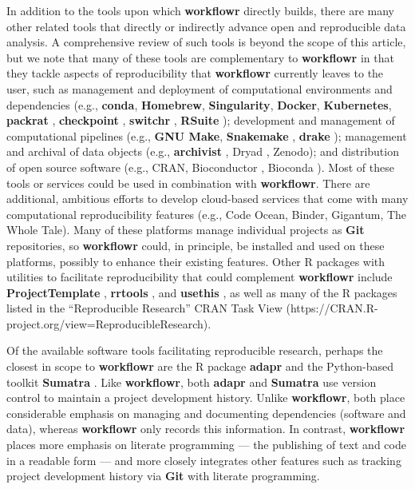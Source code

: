 \documentclass[9pt,a4paper]{extarticle}
\begin{document}
In addition to the tools upon which \textbf{workflowr} directly builds, there are
many other related tools that directly or indirectly advance open and
reproducible data analysis. A comprehensive review of such tools is
beyond the scope of this article, but we note that many of these tools
are complementary to \textbf{workflowr} in that they tackle aspects of
reproducibility that \textbf{workflowr} currently leaves to the user, such as
management and deployment of computational environments and dependencies
(e.g., \textbf{conda}, \textbf{Homebrew}, \textbf{Singularity}, \textbf{Docker}, \textbf{Kubernetes}, \textbf{packrat}
\cite{packrat}, \textbf{checkpoint} \cite{checkpoint}, \textbf{switchr} \cite{switchr},
 \textbf{RSuite} \cite{rsuite}); development and management of computational
pipelines (e.g., \textbf{GNU Make}, \textbf{Snakemake} \cite{snakemake}, \textbf{drake}
\cite{drake}); management and archival of data objects (e.g., \textbf{archivist}
\cite{archivist}, Dryad \cite{dryad}, Zenodo); and distribution of open
source software (e.g., CRAN, Bioconductor \cite{bioconductor}, Bioconda
\cite{bioconda}). Most of these tools or services could be used in
combination with \textbf{workflowr}. There are additional, ambitious efforts to
develop cloud-based services that come with many computational
reproducibility features (e.g., Code Ocean, Binder, Gigantum, The Whole
Tale). Many of these platforms manage individual projects as \textbf{Git}
repositories, so \textbf{workflowr} could, in principle, be installed and used on
these platforms, possibly to enhance their existing features. Other R
packages with utilities to facilitate reproducibility that could
complement \textbf{workflowr} include \textbf{ProjectTemplate} \cite{projecttemplate},
 \textbf{rrtools} \cite{rrtools}, and \textbf{usethis} \cite{usethis}, as well as many of
the R packages listed in the ``Reproducible Research'' CRAN Task View
(https://CRAN.R-project.org/view=ReproducibleResearch).

Of the available software tools facilitating reproducible research,
perhaps the closest in scope to \textbf{workflowr} are the R package \textbf{adapr}
\cite{Gelfond2018} and the Python-based toolkit \textbf{Sumatra}
\cite{Davidson2014}. Like \textbf{workflowr}, both \textbf{adapr} and \textbf{Sumatra} use version
control to maintain a project development history. Unlike \textbf{workflowr},
both place considerable emphasis on managing and documenting
dependencies (software and data), whereas \textbf{workflowr} only records this
information. In contrast, \textbf{workflowr} places more emphasis on literate
programming --- the publishing of text and code in a readable form ---
and more closely integrates other features such as tracking project
development history via \textbf{Git} with literate programming.
\end{document}
